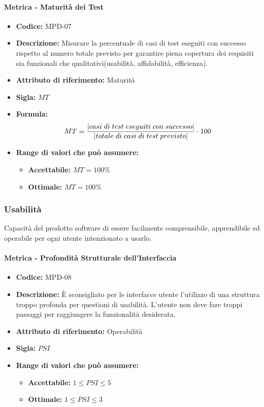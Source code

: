 \paragraph{Metrica - Maturità dei Test} 
\begin{itemize}
    \item \textbf{Codice:} MPD-07
    \item \textbf{Descrizione:} Misurare la percentuale di casi di test eseguiti con successo rispetto al numero totale previsto per garantire piena copertura dei requisiti sia funzionali che qualitativi(usabilità, affidabilità, efficienza).
    \item \textbf{Attributo di riferimento:} Maturità
    \item \textbf{Sigla:} $MT$
    \item \textbf{Formula:} $$MT = {|casi \; di \; test \; eseguiti \; con \; successo| \over |totale \; di \; casi \; di \; test \; previsto|} \cdot 100$$
    \item \textbf{Range di valori che può assumere:}
    \begin{itemize}
        \item \textbf{Accettabile:} $MT = 100\% $
        \item \textbf{Ottimale:} $MT = 100\% $
    \end{itemize}
\end{itemize}
       
\subsubsection{Usabilità}
Capacità del prodotto software di essere facilmente comprensibile, apprendibile ed operabile per ogni utente intenzionato a usarlo.

\paragraph{Metrica - Profondità Strutturale dell'Interfaccia}
\begin{itemize}
    \item \textbf{Codice:} MPD-08
    \item \textbf{Descrizione:} È sconsigliato per le interfacce utente l'utilizzo di una struttura troppo profonda per questioni di usabilità. L'utente non deve fare troppi passaggi per raggiungere la funzionalità desiderata. 
    \item \textbf{Attributo di riferimento:} Operabilità
    \item \textbf{Sigla:} $PSI$
    \item \textbf{Range di valori che può assumere:}
    \begin{itemize}
        \item \textbf{Accettabile:} $1 \leq PSI \leq 5$
        \item \textbf{Ottimale:} $1 \leq PSI \leq 3$
    \end{itemize}
\end{itemize}


